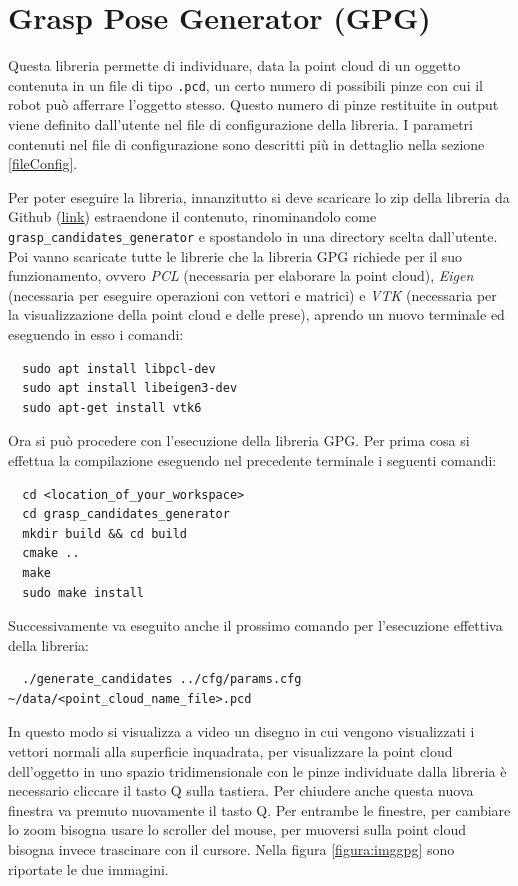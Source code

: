 \documentclass{report}
\begin{document}
\section{Grasp Pose Generator (GPG)}\label{GPG}
Questa libreria permette di individuare, data la point cloud di un oggetto contenuta in un file di tipo \texttt{.pcd}, un certo numero di possibili pinze con cui il robot può afferrare l'oggetto stesso. Questo numero di pinze restituite in output viene definito dall'utente nel file di configurazione della libreria. I parametri contenuti nel file di configurazione sono descritti più in dettaglio nella sezione \ref{fileConfig}. \par
Per poter eseguire la libreria, innanzitutto si deve scaricare lo zip della libreria da Github (\textcolor{blue}{\underline{\href{https://github.com/atenpas/gpg}{link}}}) estraendone il contenuto, rinominandolo come \texttt{grasp\_candidates\_generator} e spostandolo in una directory scelta dall'utente. Poi vanno scaricate tutte le librerie che la libreria GPG richiede per il suo funzionamento, ovvero \textit{PCL} (necessaria per elaborare la point cloud), \textit{Eigen} (necessaria per eseguire operazioni con vettori e matrici) e \textit{VTK} (necessaria per la visualizzazione della point cloud e delle prese), aprendo un nuovo terminale ed eseguendo in esso i comandi:
\begin{verbatim}
  sudo apt install libpcl-dev
  sudo apt install libeigen3-dev
  sudo apt-get install vtk6
\end{verbatim}
Ora si può procedere con l'esecuzione della libreria GPG. Per prima cosa si effettua la compilazione eseguendo nel precedente terminale i seguenti comandi:
\begin{verbatim}
  cd <location_of_your_workspace>  
  cd grasp_candidates_generator
  mkdir build && cd build
  cmake ..
  make
  sudo make install
\end{verbatim}
Successivamente va eseguito anche il prossimo comando per l'esecuzione effettiva della libreria:
\begin{verbatim}
  ./generate_candidates ../cfg/params.cfg ~/data/<point_cloud_name_file>.pcd
\end{verbatim}
In questo modo si visualizza a video un disegno in cui vengono visualizzati i vettori normali alla superficie inquadrata, per visualizzare la point cloud dell'oggetto in uno spazio tridimensionale con le pinze individuate dalla libreria è necessario cliccare il tasto Q sulla tastiera. Per chiudere anche questa nuova finestra va premuto nuovamente il tasto Q. Per entrambe le finestre, per cambiare lo zoom bisogna usare lo scroller del mouse, per muoversi sulla point cloud bisogna invece trascinare con il cursore. Nella figura \ref{figura:imggpg} sono riportate le due immagini. 
\end{document}
